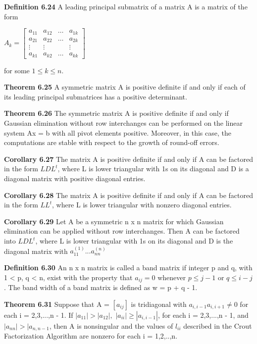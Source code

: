 \documentclass{article}
\begin{document}
\textbf {Definition 6.24} A leading principal submatrix of a matrix A is a matrix of the form 
\begin{center}
$A_k =
\begin{bmatrix}
a_{11} & a_{12} & \dots & a_{1k} \\
a_{21} & a_{22} & \dots & a_{2k} \\
\vdots & \vdots & & \vdots \\
a_{k1} & a_{k2} & \dots & a_{kk}
\end{bmatrix}
$
\end{center}

for some $1 \leq k \leq n$.

\textbf {Theorem 6.25} A symmetric matrix A is positive definite if and only if each of its leading principal submatrices has a positive determinant.

\textbf {Theorem 6.26} The symmetric matrix A is positive definite if and only if Gaussian elimination without row interchanges can be performed on the linear system Ax = b with all pivot elements positive. Moreover, in this case, the computations are stable with respect to the growth of round-off errors.

\textbf {Corollary 6.27} The matrix A is positive definite if and only if A can be factored in the form $LDL^{t}$, where L is lower triangular with 1s on its diagonal and D is a diagonal matrix with positive diagonal entries.

\textbf {Corollary 6.28} The matrix A is positive definite if and only if A can be factored in the form $LL^{t}$, where L is lower triangular with nonzero diagonal entries.

\textbf {Corollary 6.29} Let A be a symmetric n x n matrix for which Gaussian elimination can be applied without row interchanges. Then A can be factored into $LDL^{t}$, where L is lower triangular with 1s on its diagonal and D is the diagonal matrix with $a_{11}^{(1)}...a_{nn}^{(n)}$

\textbf {Definition 6.30} An n x n matrix is called a band matrix if integer p and q, with 1 < p, q < n, exist with the property that $a_{ij} = 0$ whenever $p \leq j - 1$ or $q \leq i - j$. The band width of a band matrix is defined as w = p + q - 1.

\textbf {Theorem 6.31} Suppose that A = $[a_{ij}]$ is tridiagonal with $a_{i,i-1} a_{i, i + 1} \neq 0$ for each i = 2,3,...,n - 1. If $|a_{11}| > |a_{12}|,$ $|a_{ii}| \geq |a_{i, i-1}|$, for each i = 2,3,...,n - 1, and $|a_{nn}| > |a_{n, n-1}$, then A is nonsingular and the values of $l_{ii}$ described in the Crout Factorization Algorithm are nonzero for each i = 1,2,..,n.
\end{document}
